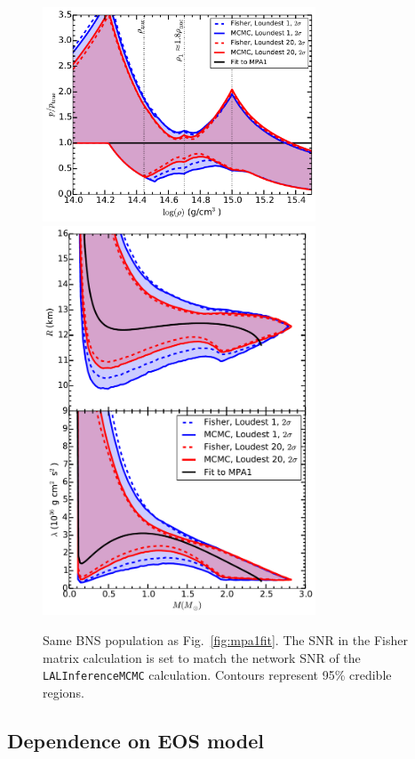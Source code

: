 \documentclass[twocolumn,prd,amssymb,aps,nofootinbib,showpacs,epsf]{revtex4}
\begin{document}
\begin{figure}[!htb]
\begin{center}
\includegraphics[width=3.2in]{CompareLALFisherZeroNoiseperror.pdf}\\
\includegraphics[width=3.2in]{CompareLALFisherZeroNoiseRadiuslambda.pdf}
\caption{Same BNS population as Fig.~\ref{fig:mpa1fit}. The SNR in the Fisher matrix calculation is set to match the network SNR of the \texttt{LALInferenceMCMC} calculation. Contours represent 95\% credible regions.}
\label{fig:fisher}
\end{center}
\end{figure}


\subsection{Dependence on EOS model}
\end{document}
